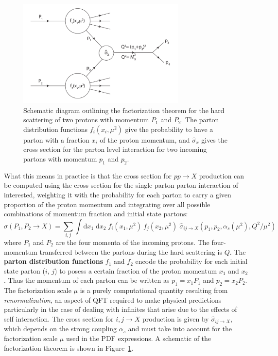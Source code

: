\begin{figure}
	\centering
	\includegraphics[width=0.75\textwidth]{factorization_diagram}
	\caption{
	Schematic diagram outlining the factorization theorem for the hard scattering of two protons with momentum $P_1$ and $P_2$.
	The parton distribution functions $f_i(x_i, \mu^2)$ give the probability to have a parton with a fraction $x_i$ of the proton momentum, and $\hat{\sigma}_x$ gives the cross section for the parton level interaction for two incoming partons with momentum $p_1$ and $p_2$.
	}
	\label{fig:factorization_diagram}
\end{figure}

What this means in practice is that the cross section for $pp \rightarrow X$ production can be computed using the cross section for the single parton-parton interaction of interested, weighting it with the probability for each parton to carry a given proportion of the proton momentum and integrating over all possible combinations of momentum fraction and initial state partons:
\begin{equation}
\sigma(P_1, P_2 \rightarrow X) = \sum_{i,j} \int \mathrm{d}x_1\; \mathrm{d}x_2\; f_i(x_1, \mu^2)\ f_j(x_2, \mu^2)\; \hat{\sigma}_{ij \rightarrow X}\left(p_1, p_2, \alpha_s(\mu^2), Q^2 / \mu^2 \right)
\end{equation}
where $P_1$ and $P_2$ are the four momenta of the incoming protons.
The four-momentum transferred between the partons during the hard scattering is $Q$.
The \textbf{parton distribution functions} $f_1$ and $f_2$ encode the probability for each initial state parton ($i$, $j$) to posess a certain fraction of the proton momentum $x_1$ and $x_2$.
Thus the momentum of each parton can be written as  $p_1 = x_1 P_1$ and $p_2 = x_2 P_2$.
The factorization scale $\mu$ is a purely computational quantity resulting from \textit{renormalization}, an aspect of QFT required to make physical predictions particularly in the case of dealing with infinites that arise due to the effects of self interaction.
The cross section for $i,j \rightarrow X$ production is given by $\hat{\sigma}_{ij \rightarrow X}$, which depends on the strong coupling $\alpha_s$ and must take into account for the factorization scale $\mu$ used in the PDF expressions.
A schematic of the factorization theorem is shown in Figure~\ref{fig:factorization_diagram}.

